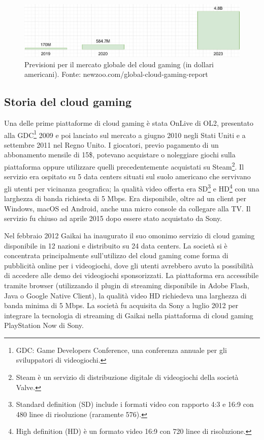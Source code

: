 \begin{figure}[H]
	\includegraphics[width=\linewidth]{immagini/Newzoo_Cloud_Gaming_Revenues}
	\caption{Previsioni per il mercato globale del cloud gaming (in dollari americani). Fonte: newzoo.com/global-cloud-gaming-report}
	\label{fig:Newzoo_Cloud_Gaming_Revenues}
\end{figure}



\subsection{Storia del cloud gaming} \label{StoriaDelCloudGaming}
Una delle prime piattaforme di cloud gaming è stata OnLive di OL2, presentato alla GDC\footnote{GDC: Game Developers Conference, una conferenza annuale per gli sviluppatori di videogiochi.} 2009 e poi lanciato sul mercato a giugno 2010 negli Stati Uniti e a settembre 2011 nel Regno Unito. I giocatori, previo pagamento di un abbonamento mensile di 15\$, potevano acquistare o noleggiare giochi sulla piattaforma oppure utilizzare quelli precedentemente acquistati su Steam\footnote{Steam è un servizio di distribuzione digitale di videogiochi della società Valve.}. Il servizio era ospitato su 5 data centers situati sul suolo americano che servivano gli utenti per vicinanza geografica; la qualità video offerta era SD\footnote{Standard definition (SD) include i formati video con rapporto 4:3 e 16:9 con 480 linee di risoluzione (raramente 576).} e HD\footnote{High definition (HD) è un formato video 16:9 con 720 linee di risoluzione.} con una larghezza di banda richiesta di 5 Mbps. Era disponibile, oltre ad un client per Windows, macOS ed Android, anche una micro console da collegare alla TV. Il servizio fu chiuso ad aprile 2015 dopo essere stato acquistato da Sony\cite{Cloud_gaming_history}.

Nel febbraio 2012 Gaikai ha inaugurato il suo omonimo servizio di cloud gaming disponibile in 12 nazioni e distribuito su 24 data centers. La società si è concentrata principalmente sull'utilizzo del cloud gaming come forma di pubblicità online per i videogiochi, dove gli utenti avrebbero avuto la possibilità di accedere alle demo dei videogiochi sponsorizzati. La piattaforma era accessibile tramite browser (utilizzando il plugin di streaming disponibile in Adobe Flash, Java o Google Native Client), la qualità video HD richiedeva una larghezza di banda minima di 5 Mbps. La società fu acquisita da Sony a luglio 2012 per integrare la tecnologia di streaming di Gaikai nella piattaforma di cloud gaming PlayStation Now di Sony\cite{Gaikai_Beta}.

